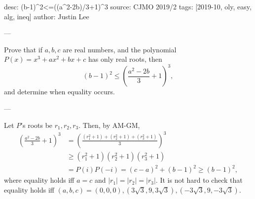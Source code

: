 desc: (b-1)^2<=((a^2-2b)/3+1)^3
source: CJMO 2019/2
tags: [2019-10, oly, easy, alg, ineq]
author: Justin Lee

---

Prove that if $a,b,c$ are real numbers, and the polynomial $P(x)=x^3+ax^2+bx+c$ has only real roots, then \[(b-1)^2 \le \left(\frac{a^2-2b}{3}+1\right)^3,\]
and determine when equality occurs.

---

Let $P$'s roots be $r_1,r_2,r_3$. Then, by AM-GM,
\begin{align*}
    \left(\frac{a^2-2b}{3}+1\right)^3&=\left(\frac{(r_1^2+1)+(r_2^2+1)+(r_3^2+1)}{3}\right)^3\\
    &\ge (r_1^2 + 1)(r_2^2 + 1)(r_3^2+1)\\
    &=P(i)P(-i)=(c-a)^2+(b-1)^2\ge (b-1)^2,
\end{align*}
where equality holds iff $a=c$ and $|r_1|=|r_2|=|r_3|$. It is not hard to check that equality holds iff $(a,b,c)=(0,0,0),(3\sqrt{3},9,3\sqrt{3}),(-3\sqrt{3},9,-3\sqrt{3})$.
